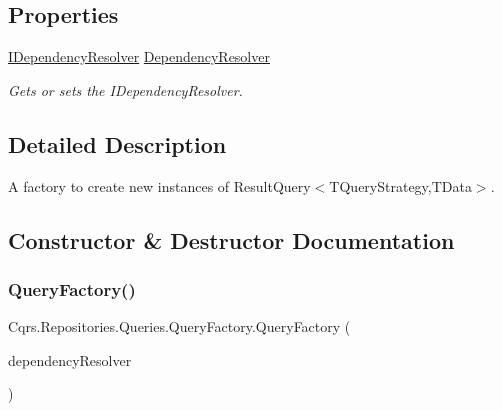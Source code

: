 \subsection*{Properties}
\begin{DoxyCompactItemize}
\item 
\hyperlink{interfaceCqrs_1_1Configuration_1_1IDependencyResolver}{I\+Dependency\+Resolver} \hyperlink{classCqrs_1_1Repositories_1_1Queries_1_1QueryFactory_a550e1e11b126247c5adebdd384000252_a550e1e11b126247c5adebdd384000252}{Dependency\+Resolver}
\begin{DoxyCompactList}\small\item\em Gets or sets the I\+Dependency\+Resolver. \end{DoxyCompactList}\end{DoxyCompactItemize}


\subsection{Detailed Description}
A factory to create new instances of Result\+Query$<$\+T\+Query\+Strategy,\+T\+Data$>$. 



\subsection{Constructor \& Destructor Documentation}
\mbox{\label{classCqrs_1_1Repositories_1_1Queries_1_1QueryFactory_a8956a30f5d8abbf49ca4ca24756a83da_a8956a30f5d8abbf49ca4ca24756a83da}} 
\subsubsection{\texorpdfstring{Query\+Factory()}{QueryFactory()}}
{\footnotesize\ttfamily Cqrs.\+Repositories.\+Queries.\+Query\+Factory.\+Query\+Factory (\begin{DoxyParamCaption}\item[{\hyperlink{interfaceCqrs_1_1Configuration_1_1IDependencyResolver}{I\+Dependency\+Resolver}}]{dependency\+Resolver }\end{DoxyParamCaption})}



